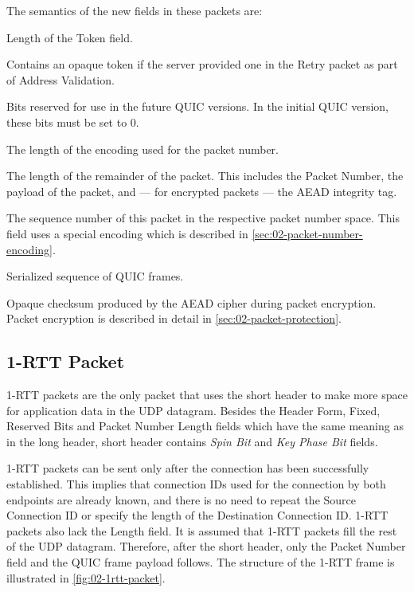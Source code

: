 The semantics of the new fields in these packets are:

\begin{description}

     Length of the Token field.

     Contains an opaque token if the server provided
    one in the Retry packet as part of Address Validation.

     Bits reserved for use in the future QUIC versions. In the initial QUIC
    version, these bits must be set to 0.

     The length of the encoding used for the packet number.

     The length of the remainder of the packet. This includes the Packet Number,
    the payload of the packet, and --- for encrypted packets --- the AEAD integrity tag.

     The sequence number of this packet in the respective packet number space.
    This field uses a special encoding which is described in \autoref{sec:02-packet-number-encoding}.

     Serialized sequence of QUIC frames.

     Opaque checksum produced by the AEAD cipher during packet encryption.
    Packet encryption is described in detail in \autoref{sec:02-packet-protection}.

\end{description}

\subsection{1-RTT Packet}

1-RTT packets are the only packet that uses the short header to make more space for application data
in the UDP datagram. Besides the Header Form, Fixed, Reserved Bits and Packet Number Length fields
which have the same meaning as in the long header, short header contains \textit{Spin Bit} and
\textit{Key Phase Bit} fields.

1-RTT packets can be sent only after the connection has been successfully established. This implies
that connection IDs used for the connection by both endpoints are already known, and there is no
need to repeat the Source Connection ID or specify the length of the Destination Connection ID.
1-RTT packets also lack the Length field. It is assumed that 1-RTT packets fill the rest of the UDP
datagram. Therefore, after the short header, only the Packet Number field and the QUIC frame payload
follows. The structure of the 1-RTT frame is illustrated in \autoref{fig:02-1rtt-packet}.

